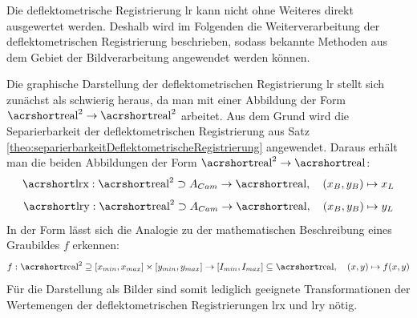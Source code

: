 Die deflektometrische Registrierung \acrshort{lr} kann nicht ohne Weiteres direkt ausgewertet werden.
Deshalb wird im Folgenden die Weiterverarbeitung der deflektometrischen Registrierung beschrieben, sodass bekannte Methoden aus dem Gebiet der Bildverarbeitung angewendet werden können.

\p
Die graphische Darstellung der deflektometrischen Registrierung \acrshort{lr} stellt sich zunächst als schwierig heraus, da man mit einer Abbildung der Form $\acrshortmath{real}^2 \rightarrow \acrshortmath{real}^2$ arbeitet.
Aus dem Grund wird die Separierbarkeit der deflektometrischen Registrierung aus Satz \ref{theo:separierbarkeitDeflektometrischeRegistrierung} angewendet.
Daraus erhält man die beiden Abbildungen der Form $\acrshortmath{real}^2 \rightarrow \acrshortmath{real}$:
%
\begin{equation*}
	\acrshortmath{lrx} : \acrshortmath{real}^{2} \supset A_{Cam} \rightarrow \acrshortmath{real} ,\quad (x_{B}, y_{B}) \mapsto x_{L}
\end{equation*}
%
\begin{equation*}
	\acrshortmath{lry} : \acrshortmath{real}^{2} \supset A_{Cam} \rightarrow \acrshortmath{real} ,\quad (x_{B}, y_{B}) \mapsto y_{L}
\end{equation*}
%
In der Form lässt sich die Analogie zu der mathematischen Beschreibung eines Graubildes $f$ erkennen:
%
\begin{equation*}
	f : \acrshortmath{real}^{2} \supseteq [x_{min},x_{max}] \times [y_{min},y_{max}] \rightarrow [I_{min},I_{max}] \subseteq \acrshortmath{real} ,\quad (x,y) \mapsto f(x,y)
\end{equation*}
%
Für die Darstellung als Bilder sind somit lediglich geeignete Transformationen der Wertemengen der deflektometrischen Registrierungen \acrshort{lrx} und \acrshort{lry} nötig.
%
